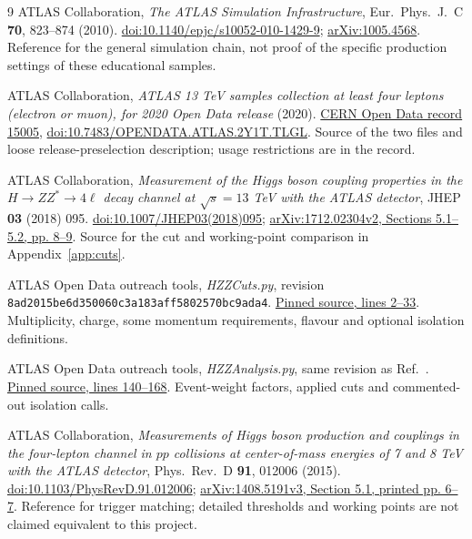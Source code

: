 \documentclass[11pt,a4paper]{article}
\begin{document}
\begingroup
\small
{}
\renewcommand{\refname}{References}
\begin{thebibliography}{9}
ATLAS Collaboration, \emph{The ATLAS Simulation Infrastructure},
Eur.~Phys.~J.~C \textbf{70}, 823--874 (2010).
\href{https://doi.org/10.1140/epjc/s10052-010-1429-9}{doi:10.1140/epjc/s10052-010-1429-9};
\href{https://arxiv.org/abs/1005.4568}{arXiv:1005.4568}.
Reference for the general simulation chain, not proof of the specific production settings of these educational samples.

ATLAS Collaboration, \emph{ATLAS 13 TeV samples collection at least four leptons
(electron or muon), for 2020 Open Data release} (2020).
\href{https://opendata.cern.ch/record/15005}{CERN Open Data record 15005},
\href{https://doi.org/10.7483/OPENDATA.ATLAS.2Y1T.TLGL}{doi:10.7483/OPENDATA.ATLAS.2Y1T.TLGL}.
Source of the two files and loose release-preselection description; usage restrictions are in the record.

ATLAS Collaboration, \emph{Measurement of the Higgs boson coupling properties in
the $H\to ZZ^*\to4\ell$ decay channel at $\sqrt{s}=13$ TeV with the ATLAS detector},
JHEP \textbf{03} (2018) 095.
\href{https://doi.org/10.1007/JHEP03(2018)095}{doi:10.1007/JHEP03(2018)095};
\href{https://arxiv.org/pdf/1712.02304v2#page=8}{arXiv:1712.02304v2, Sections 5.1--5.2, pp. 8--9}.
Source for the cut and working-point comparison in Appendix~\ref{app:cuts}.

ATLAS Open Data outreach tools, \emph{HZZCuts.py}, revision
\nolinkurl{8ad2015be6d350060c3a183aff5802570bc9ada4}.
\href{https://github.com/atlas-outreach-data-tools/atlas-outreach-Python-uproot-framework-13tev/blob/8ad2015be6d350060c3a183aff5802570bc9ada4/HZZCuts.py#L2-L33}{Pinned source, lines 2--33}.
Multiplicity, charge, some momentum requirements, flavour and optional isolation definitions.

ATLAS Open Data outreach tools, \emph{HZZAnalysis.py}, same revision as Ref.~\cite{HZZCuts}.
\href{https://github.com/atlas-outreach-data-tools/atlas-outreach-Python-uproot-framework-13tev/blob/8ad2015be6d350060c3a183aff5802570bc9ada4/HZZAnalysis.py#L140-L168}{Pinned source, lines 140--168}.
Event-weight factors, applied cuts and commented-out isolation calls.

ATLAS Collaboration, \emph{Measurements of Higgs boson production and couplings
in the four-lepton channel in $pp$ collisions at center-of-mass energies of
7 and 8 TeV with the ATLAS detector}, Phys.~Rev.~D \textbf{91}, 012006 (2015).
\href{https://doi.org/10.1103/PhysRevD.91.012006}{doi:10.1103/PhysRevD.91.012006};
\href{https://arxiv.org/pdf/1408.5191v3#page=7}{arXiv:1408.5191v3, Section 5.1, printed pp. 6--7}.
Reference for trigger matching; detailed thresholds and working points are not claimed equivalent to this project.


\end{thebibliography}
\end{document}
